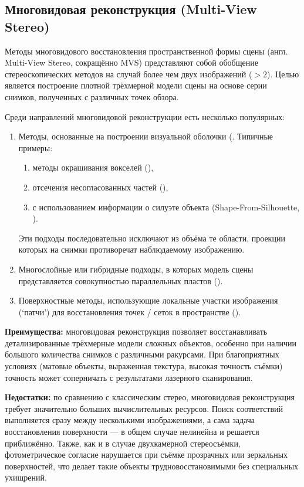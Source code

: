 \subsection{Многовидовая реконструкция (Multi-View Stereo)}

Методы многовидового восстановления пространственной формы сцены (англ.
Multi-View Stereo, сокращённо MVS) представляют собой обобщение
стереоскопических методов на случай более чем двух изображений ($>2$). Целью
является построение плотной трёхмерной модели сцены на основе серии снимков,
полученных с различных точек обзора.

Среди направлений многовидовой реконструкции есть несколько популярных:

\begin{enumerate}
	\item Методы, основанные на построении визуальной оболочки (\cite{10.1109/34.273735}.
	Типичные примеры:
	\begin{enumerate}
		\item методы окрашивания вокселей (\cite{10.5555/794189.794361}),
		\item отсечения несогласованных частей (\cite{10.5555/898435}),
		\item с использованием информации о силуэте объекта (Shape-From-Silhouette, \cite{Matusik2002VHull}).
	\end{enumerate}
	Эти подходы последовательно исключают из объёма те области, проекции которых
	на снимки противоречат наблюдаемому изображению.

	\item Многослойные или гибридные подходы, в которых модель сцены
	представляется совокупностью параллельных пластов (\cite{10.1109/CVPR.1998.698642}).

	\item Поверхностные методы, использующие локальные участки изображения
	(`патчи') для восстановления точек /
	сеток в пространстве (\cite{10.1109/CVPR.2007.383246}).

\end{enumerate}

\textbf{Преимущества:} многовидовая реконструкция позволяет восстанавливать
детализированные трёхмерные модели сложных объектов, особенно при наличии
большого количества снимков с различными ракурсами. При благоприятных условиях
(матовые объекты, выраженная текстура, высокая точность съёмки) точность может
соперничать с результатами лазерного сканирования.

\textbf{Недостатки:} по сравнению с классическим стерео, многовидовая
реконструкция требует значительно больших вычислительных ресурсов. Поиск
соответствий выполняется сразу между несколькими изображениями, а сама задача
восстановления поверхности — в общем случае нелинейна и решается приближённо.
Также, как и в случае двухкамерной стереосъёмки, фотометрическое согласие
нарушается при съёмке прозрачных или зеркальных поверхностей, что делает такие
объекты трудновосстановимыми без специальных ухищрений.

